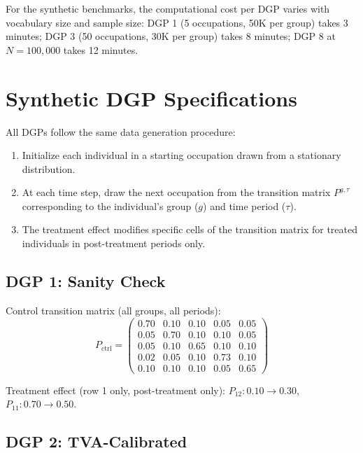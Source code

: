 \documentclass[12pt]{article}
\begin{document}
For the synthetic benchmarks, the computational cost per DGP varies with vocabulary size and sample size: DGP 1 (5 occupations, 50K per group) takes 3 minutes; DGP 3 (50 occupations, 30K per group) takes 8 minutes; DGP 8 at $N = 100,000$ takes 12 minutes.


\section{Synthetic DGP Specifications}\label{app:dgp}

All DGPs follow the same data generation procedure:
\begin{enumerate}
\item Initialize each individual in a starting occupation drawn from a stationary distribution.
\item At each time step, draw the next occupation from the transition matrix $P^{g,\tau}$ corresponding to the individual's group ($g$) and time period ($\tau$).
\item The treatment effect modifies specific cells of the transition matrix for treated individuals in post-treatment periods only.
\end{enumerate}

\subsection{DGP 1: Sanity Check}

Control transition matrix (all groups, all periods):
\begin{equation}
P_{\text{ctrl}} = \begin{pmatrix}
0.70 & 0.10 & 0.10 & 0.05 & 0.05 \\
0.05 & 0.70 & 0.10 & 0.10 & 0.05 \\
0.05 & 0.10 & 0.65 & 0.10 & 0.10 \\
0.02 & 0.05 & 0.10 & 0.73 & 0.10 \\
0.10 & 0.10 & 0.10 & 0.05 & 0.65
\end{pmatrix}
\end{equation}

Treatment effect (row 1 only, post-treatment only): $P_{12}: 0.10 \to 0.30$, $P_{11}: 0.70 \to 0.50$.

\subsection{DGP 2: TVA-Calibrated}
\end{document}
